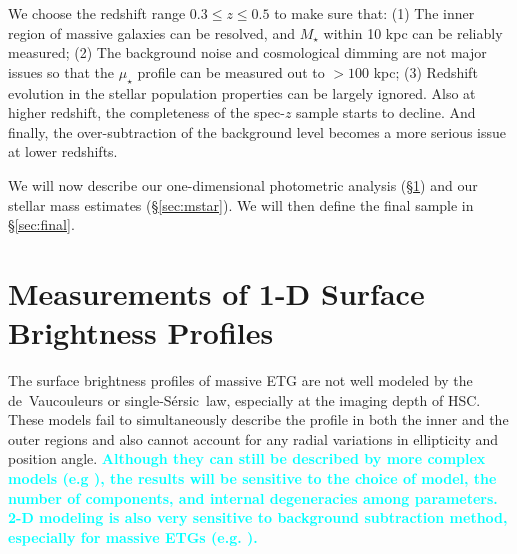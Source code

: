 \documentclass[a4paper,fleqn,usenatbib]{mnras}
\def\ser{{S\'{e}rsic\ }}
\def\mstar{{$M_{\star}$}}
\def\mden{{$\mu_{\star}$}}
\newcommand{\song}[1]{\textcolor{cyan}{\textbf{#1}}}
\begin{document}
    We choose the redshift range $0.3 \leq z \leq 0.5$ to make sure that: 
    (1) The inner region of massive galaxies can be resolved, and \mstar{} within 
    10 kpc can be reliably measured; 
    (2) The background noise and cosmological dimming are not major issues so that the 
    \mden{} profile can be measured out to $>100$ kpc; 
    (3) Redshift evolution in the stellar population properties can be largely 
    ignored.  
    Also at higher redshift, the completeness of the spec-$z$ sample starts to decline. 
    And finally, the over-subtraction of the background level becomes a more serious 
    issue at lower redshifts.  
   
    We will now describe our one-dimensional photometric analysis 
    (\S \ref{sec:ellipse}) and our stellar mass estimates (\S \ref{sec:mstar}). 
    We will then define the final sample in \S \ref{sec:final}.

\section{Measurements of 1-D Surface Brightness Profiles}
    \label{sec:ellipse}
    
    The surface brightness profiles of massive ETG are not well modeled by the 
    de~Vaucouleurs or single-\ser law, especially at the imaging depth of HSC.
    These models fail to simultaneously describe the profile in both the inner 
    and the outer regions and also cannot account for any radial variations in 
    ellipticity and position angle. 
    \song{
    Although they can still be described by more complex models 
    (e.g \citealt{Huang2013a, Huang2013b, Oh2017}), the results will be 
    sensitive to the choice of model, the number of components, and internal 
    degeneracies among parameters. 
    2-D modeling is also very sensitive to background subtraction method, 
    especially for massive ETGs (e.g. \citealt{Huang2013a}).
    }
    
\end{document}
